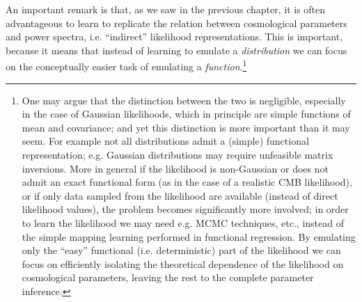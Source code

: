 An important remark is that, as we saw in the previous chapter, it is often advantageous to learn to replicate the relation between cosmological parameters and power spectra, i.e. ``indirect'' likelihood representations. This is important, because it means that instead of learning to emulate a \emph{distribution} we can focus on the conceptually easier task of emulating a \emph{function}.\footnote{One may argue that the distinction between the two is negligible, especially in the case of Gaussian likelihoods, which in principle are simple functions of mean and covariance; and yet this distinction is more important than it may seem. For example not all distributions admit a (simple) functional representation; e.g. Gaussian distributions may require unfeasible matrix inversions. More in general if the likelihood is non-Gaussian or does not admit an exact functional form (as in the case of a realistic CMB likelihood), or if only data sampled from the likelihood are available (instead of direct likelihood values), the problem becomes significantly more involved; in order to learn the likelihood we may need e.g. MCMC techniques, etc., instead of the simple mapping learning performed in functional regression.
By emulating only the ``easy'' functional (i.e. deterministic) part of the likelihood we can focus on efficiently isolating the theoretical dependence of the likelihood on cosmological parameters, leaving the rest to the complete parameter inference.}

